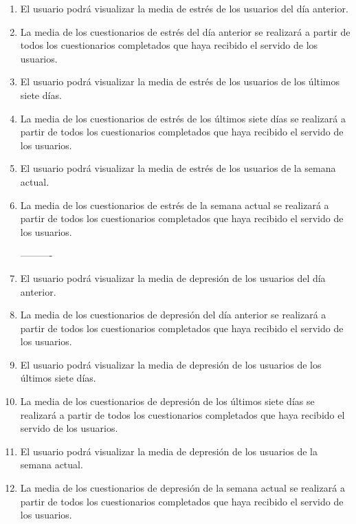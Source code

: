 \begin{enumerate}[label=\textbf{\texttt{RF-\arabic*}}]
            ----------
            \item El usuario podrá visualizar la media de estrés de los usuarios del día anterior.
            \item La media de los cuestionarios de estrés del día anterior se realizará a partir de todos los cuestionarios completados que haya recibido el servido de los usuarios.
            \item El usuario podrá visualizar la media de estrés de los usuarios de los últimos siete días.
            \item La media de los cuestionarios de estrés de los últimos siete días se realizará a partir de todos los cuestionarios completados que haya recibido el servido de los usuarios.
            \item El usuario podrá visualizar la media de estrés de los usuarios de la semana actual.
            \item La media de los cuestionarios de estrés de la semana actual se realizará a partir de todos los cuestionarios completados que haya recibido el servido de los usuarios.
            
            ----------
            \item El usuario podrá visualizar la media de depresión de los usuarios del día anterior.
            \item La media de los cuestionarios de depresión del día anterior se realizará a partir de todos los cuestionarios completados que haya recibido el servido de los usuarios.
            \item El usuario podrá visualizar la media de depresión de los usuarios de los últimos siete días.
            \item La media de los cuestionarios de depresión de los últimos siete días se realizará a partir de todos los cuestionarios completados que haya recibido el servido de los usuarios.
            \item El usuario podrá visualizar la media de depresión de los usuarios de la semana actual.
            \item La media de los cuestionarios de depresión de la semana actual se realizará a partir de todos los cuestionarios completados que haya recibido el servido de los usuarios.
            

\end{enumerate}
